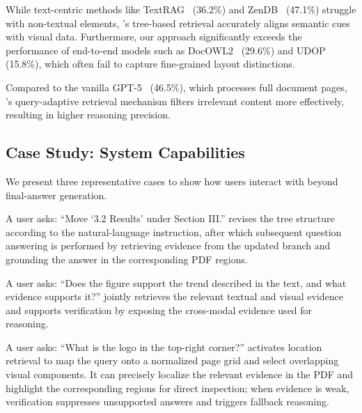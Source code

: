 While text-centric methods like TextRAG~\cite{TextRAG} (36.2\%) and ZenDB~\cite{ZenDB} (47.1\%) struggle with non-textual elements, \modora's tree-based retrieval accurately aligns semantic cues with visual data. Furthermore, our approach significantly exceeds the performance of end-to-end models such as DocOWL2~\cite{DocOwl2} (29.6\%) and UDOP~\cite{UDOP} (15.8\%), which often fail to capture fine-grained layout distinctions.

 Compared to the vanilla GPT-5~\cite{GPT-5} (46.5\%), which processes full document pages, \modora's query-adaptive retrieval mechanism filters irrelevant content more effectively, resulting in higher reasoning precision.

\subsection{Case Study: System Capabilities}\label{subsec:case_study}
We present three representative cases to show how users interact with \modora beyond final-answer generation.

 A user asks: ``Move `3.2 Results' under Section III.'' \modora revises the tree structure according to the natural-language instruction, after which subsequent question answering is performed by retrieving evidence from the updated branch and grounding the answer in the corresponding PDF regions.

 A user asks: ``Does the figure support the trend described in the text, and what evidence supports it?'' \modora jointly retrieves the relevant textual and visual evidence and supports verification by exposing the cross-modal evidence used for reasoning.

 A user asks: ``What is the logo in the top-right corner?'' \modora activates location retrieval to map the query onto a normalized page grid and select overlapping visual components. It can precisely localize the relevant evidence in the PDF and highlight the corresponding regions for direct inspection; when evidence is weak, verification suppresses unsupported answers and triggers fallback reasoning.
